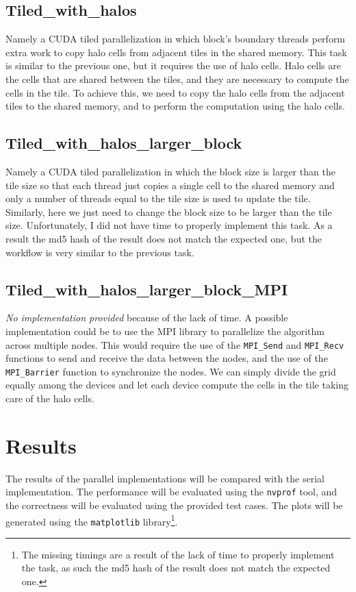 \documentclass{article}
\begin{document}
\subsection{Tiled\_with\_halos}
Namely a CUDA tiled parallelization in which block’s boundary threads perform extra work to copy halo cells from adjacent tiles in the shared memory.
This task is similar to the previous one, but it requires the use of halo cells. Halo cells are the cells that are shared between the tiles, and they are necessary to compute the cells in the tile. To achieve this, we need to copy the halo cells from the adjacent tiles to the shared memory, and to perform the computation using the halo cells.

\subsection{Tiled\_with\_halos\_larger\_block}
Namely a CUDA tiled parallelization in which the block size is larger than the tile size so that each thread just copies a single cell to the shared memory and only a number of threads equal to the tile size is used to update the tile.
Similarly, here we just need to change the block size to be larger than the tile size. Unfortunately, I did not have time to properly implement this task. As a result the md5 hash of the result does not match the expected one, but the workflow is very similar to the previous task.

\subsection{Tiled\_with\_halos\_larger\_block\_MPI}
\textit{No implementation provided} because of the lack of time.
A possible implementation could be to use the MPI library to parallelize the algorithm across multiple nodes. This would require the use of the \texttt{MPI\_Send} and \texttt{MPI\_Recv} functions to send and receive the data between the nodes, and the use of the \texttt{MPI\_Barrier} function to synchronize the nodes. We can simply divide the grid equally among the devices and let each device compute the cells in the tile taking care of the halo cells.

\newpage

\section{Results}
The results of the parallel implementations will be compared with the serial implementation. The performance will be evaluated using the \texttt{nvprof} tool, and the correctness will be evaluated using the provided test cases. The plots will be generated using the \texttt{matplotlib} library\footnote{The missing timings are a result of the lack of time to properly implement the task, as such the md5 hash of the result does not match the expected one.}.
\end{document}
